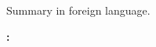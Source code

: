 \noindent
Summary in foreign language.

\noindent
\textbf{\klicovaSlovaCiziLit: } \klicovaslovaCizi
